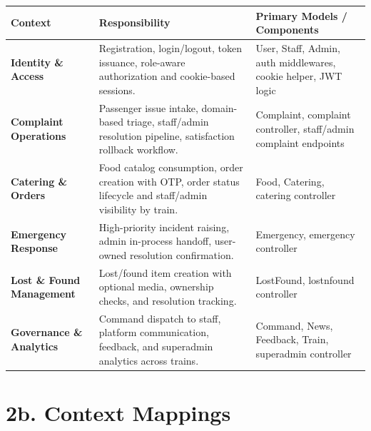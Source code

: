 \documentclass[12pt,a4paper]{report}
\begin{document}
\begin{table}[H]
\centering
\begin{tabularx}{\textwidth}{>{\bfseries}p{}Y Y}
\toprule
{}
\textcolor{TableHeaderText}{Context} & \textcolor{TableHeaderText}{Responsibility} & \textcolor{TableHeaderText}{Primary Models / Components} \\
\midrule
Identity \& Access & Registration, login/logout, token issuance, role-aware authorization and cookie-based sessions. & User, Staff, Admin, auth middlewares, cookie helper, JWT logic \\
Complaint Operations & Passenger issue intake, domain-based triage, staff/admin resolution pipeline, satisfaction rollback workflow. & Complaint, complaint controller, staff/admin complaint endpoints \\
Catering \& Orders & Food catalog consumption, order creation with OTP, order status lifecycle and staff/admin visibility by train. & Food, Catering, catering controller \\
Emergency Response & High-priority incident raising, admin in-process handoff, user-owned resolution confirmation. & Emergency, emergency controller \\
Lost \& Found Management & Lost/found item creation with optional media, ownership checks, and resolution tracking. & LostFound, lostnfound controller \\
Governance \& Analytics & Command dispatch to staff, platform communication, feedback, and superadmin analytics across trains. & Command, News, Feedback, Train, superadmin controller \\
\bottomrule
\end{tabularx}
\end{table}

\section{2b. Context Mappings}
\end{document}
